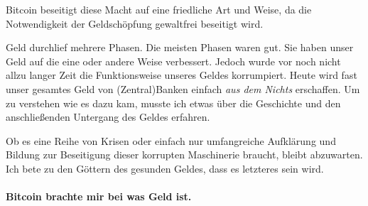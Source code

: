 Bitcoin beseitigt diese Macht auf eine friedliche Art und Weise, da die
Notwendigkeit der Geldschöpfung gewaltfrei beseitigt wird.

Geld durchlief mehrere Phasen. Die meisten Phasen waren gut. Sie haben unser
Geld auf die eine oder andere Weise verbessert. Jedoch wurde vor noch nicht
allzu langer Zeit die Funktionsweise unseres Geldes korrumpiert. Heute wird fast
unser gesamtes Geld von (Zentral)Banken einfach \textit{aus dem Nichts}
erschaffen. Um zu verstehen wie es dazu kam, musste ich etwas über die
Geschichte und den anschließenden Untergang des Geldes erfahren.

Ob es eine Reihe von Krisen oder einfach nur umfangreiche Aufklärung und Bildung
zur Beseitigung dieser korrupten Maschinerie braucht, bleibt abzuwarten. Ich
bete zu den Göttern des gesunden Geldes, dass es letzteres sein wird.

\paragraph{Bitcoin brachte mir bei was Geld ist.}

%
%
%
%
